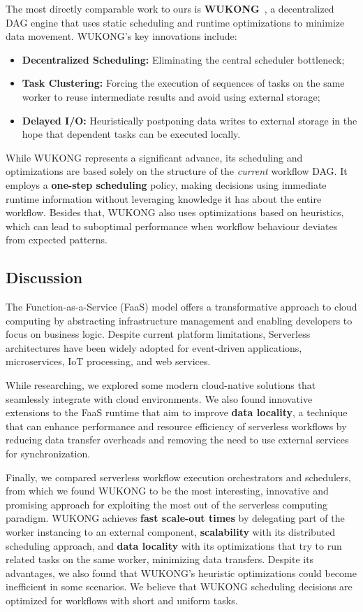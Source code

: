 \documentclass[conference]{IEEEtran}
\begin{document}
The most directly comparable work to ours is \textbf{WUKONG}~\cite{wukong_2}, a decentralized DAG engine that uses static scheduling and runtime optimizations to minimize data movement. WUKONG's key innovations include:
\begin{itemize}
    \item \textbf{Decentralized Scheduling:} Eliminating the central scheduler bottleneck;
    \item \textbf{Task Clustering:} Forcing the execution of sequences of tasks on the same worker to reuse intermediate results and avoid using external storage;
    \item \textbf{Delayed I/O:} Heuristically postponing data writes to external storage in the hope that dependent tasks can be executed locally.
\end{itemize}

While WUKONG represents a significant advance, its scheduling and optimizations are based solely on the structure of the \textit{current} workflow DAG. It employs a \textbf{one-step scheduling} policy, making decisions using immediate runtime information without leveraging knowledge it has about the entire workflow. Besides that, WUKONG also uses optimizations based on heuristics, which can lead to suboptimal performance when workflow behaviour deviates from expected patterns.

\subsection{Discussion}
The Function-as-a-Service (FaaS) model offers a transformative approach to cloud computing by abstracting infrastructure management and enabling developers to focus on business logic. Despite current platform limitations, Serverless architectures have been widely adopted for event-driven applications, microservices, IoT processing, and web services.

While researching, we explored some modern cloud-native solutions that seamlessly integrate with cloud environments. We also found innovative extensions to the FaaS runtime that aim to improve \textbf{data locality}, a technique that can enhance performance and resource efficiency of serverless workflows by reducing data transfer overheads and removing the need to use external services for synchronization.

Finally, we compared serverless workflow execution orchestrators and schedulers, from which we found WUKONG to be the most interesting, innovative and promising approach for exploiting the most out of the serverless computing paradigm. WUKONG achieves \textbf{fast scale-out times} by delegating part of the worker instancing to an external component, \textbf{scalability} with its distributed scheduling approach, and \textbf{data locality} with its optimizations that try to run related tasks on the same worker, minimizing data transfers. Despite its advantages, we also found that WUKONG’s heuristic optimizations could become inefficient in some scenarios. We believe that WUKONG scheduling decisions are optimized for workflows with short and uniform tasks.
\end{document}
